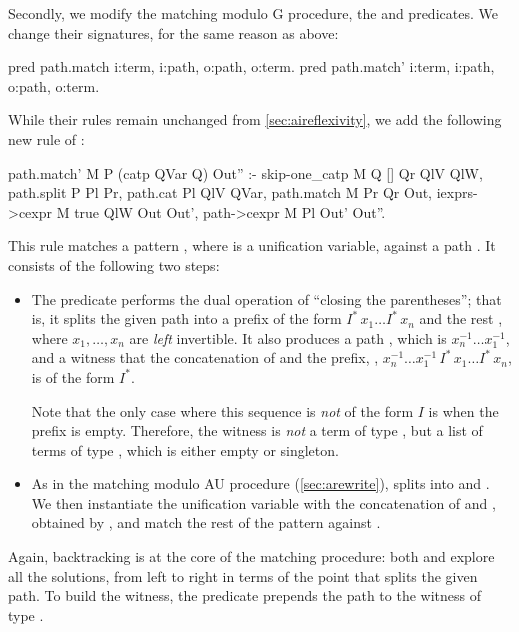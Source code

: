 \documentclass[a4paper,UKenglish,cleveref,autoref]{lipics-v2021}
\begin{document}
Secondly, we modify the matching modulo G procedure, the  and 
predicates.
We change their signatures, for the same reason as above:
\begin{elpicode}
pred path.match i:term, i:path, o:path, o:term.
pred path.match' i:term, i:path, o:path, o:term.
\end{elpicode}
While their rules remain unchanged from \cref{sec:aireflexivity}, we add the following new rule of
:
\begin{elpicode}
path.match' M P (catp QVar Q) Out'' :-
  skip-one_catp M Q [] Qr QlV QlW,
  path.split P Pl Pr,
  path.cat Pl QlV QVar,
  path.match M Pr Qr Out,
  iexprs->cexpr M {{ true }} QlW Out Out',
  path->cexpr M Pl Out' Out''.
\end{elpicode}
This rule matches a pattern , where  is a unification variable, against
a path . It consists of the following two steps:
\begin{itemize}
\item The  predicate performs the dual operation of ``closing the parentheses'';
  that is, it splits the given path  into a prefix of the form $I^* \, x_1 \dots I^* \, x_n$
  and the rest , where $x_1, \dots, x_n$ are \emph{left} invertible.
  It also produces a path , which is $x_n^{-1} \dots x_1^{-1}$, and a witness 
  that the concatenation of  and the prefix, \ie,
  $x_n^{-1} \dots x_1^{-1} \, I^* \, x_1 \dots I^* \, x_n$, is of the form $I^*$.

  Note that the only case where this sequence is \emph{not} of the form $I$ is when the prefix is
  empty. Therefore, the witness  is \emph{not} a term of type , but a list
  of terms of type , which is either empty or singleton.
\item As in the matching modulo AU procedure (\cref{sec:arewrite}),  splits
   into  and .
  We then instantiate the unification variable  with the concatenation of  and
  , obtained by , and match the rest of the pattern  against
  .
\end{itemize}
Again, backtracking is at the core of the matching procedure: both  and
 explore all the solutions, from left to right in terms of the point that splits
the given path.
To build the witness, the  predicate prepends the path  to
the witness of type .
\end{document}
